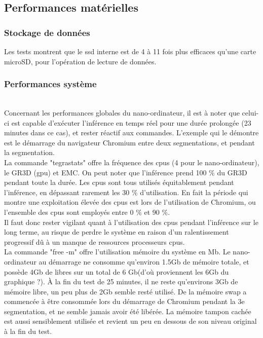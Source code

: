 ﻿\subsection{Performances matérielles}
\subsubsection{Stockage de données}
\noindent Les tests montrent que le \acrshort{ssd} interne est de 4 à 11 fois plus efficaces qu'une carte microSD, pour l'opération de lecture de données. 
\subsubsection{Performances système}
\vspace{\baselineskip}
\\
\noindent Concernant les performances globales du nano-ordinateur, il est à noter que celui-ci est capable d'exécuter l'inférence en temps réel pour une durée prolongée (23 minutes dans ce cas), et rester réactif aux commandes. L'exemple qui le démontre est le démarrage du navigateur Chromium entre deux segmentations, et pendant la segmentation.
\vspace{\baselineskip}
\\
\noindent La commande "tegrastats" offre la fréquence des \acrshort{cpu}s (4 pour le nano-ordinateur), le GR3D (\acrshort{gpu}) et EMC. On peut noter que l'inférence prend 100 \% du GR3D pendant toute la durée. Les \acrshort{cpu}s sont tous utilisés équitablement pendant l'inférence, en dépassant rarement les 30 \% d'utilisation. En fait la période qui montre une exploitation élevée des \acrshort{cpu}s est lors de l'utilisation de Chromium, ou l'ensemble des \acrshort{cpu}s sont employés entre 0 \% et 90 \%. 
\vspace{\baselineskip}
\\
\noindent Il faut donc rester vigilant quant à l'utilisation des \acrshort{cpu}s pendant l'inférence sur le long terme, au risque de perdre le système en raison d'un ralentissement progressif dû à un manque de ressources processeurs \acrshort{cpu}s.
\vspace{\baselineskip}
\\
\noindent La commande "free -m" offre l'utilisation mémoire du système en Mb. Le nano-ordinateur au démarrage ne consomme qu'environ 1.5Gb de mémoire totale, et possède 4Gb de libres sur un total de 6 Gb(d'où proviennent les 6Gb du graphique ?). À la fin du test de 25 minutes, il ne reste qu'environs 3Gb de mémoire libre, un peu plus de 2Gb semble resté utilisé. De la mémoire swap a commencée à être consommée lors du démarrage de Chromium pendant la 3e segmentation, et ne semble jamais avoir été libérée. La mémoire tampon cachée est aussi sensiblement utilisée et revient un peu en dessous de son niveau original à la fin du test. 
